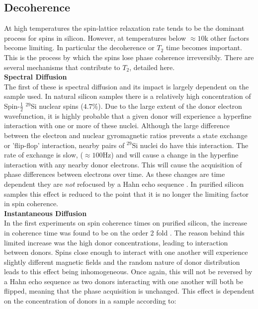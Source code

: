 \subsection{Decoherence}
\label{sec:litdecoherence}

At high temperatures the spin-lattice relaxation rate tends to be the dominant process for spins in silicon.
However, at temperatures below $\approx 10$k other factors become limiting. 
In particular the decoherence or $T_2$ time becomes important. 
This is the process by which the spins lose phase coherence irreversibly. 
There are several mechanisms that contribute to $T_2$, detailed here.
\\
\textbf{Spectral Diffusion}
\\
The first of these is spectral diffusion and its impact is largely dependent on the sample used.
In natural silicon samples there is a relatively high concentration of Spin-$\frac{1}{2}$ $^{29}$Si nuclear spins ($4.7\%$). 
Due to the large extent of the donor electron wavefunction, it is highly probable that a given donor will experience a hyperfine interaction with one or more of these nuclei.
Although the large difference between the electron and nuclear gyromagnetic ratios prevents a state exchange or 'flip-flop' interaction, nearby pairs of $^{29}$Si nuclei do have this interaction.
The rate of exchange is slow, ($\approx 100$Hz) and will cause a change in the hyperfine interaction with any nearby donor electrons.
This will cause the acquisition of phase differences between electrons over time.
As these changes are time dependent they are \textit{not} refocused by a Hahn echo sequence \cite{Wolfowicz2015a}. 
In purified silicon samples this effect is reduced to the point that it is no longer the limiting factor in spin coherence.
\\
\textbf{Instantaneous Diffusion}
\\
In the first experiments on spin coherence times on purified silicon, the increase in coherence time was found to be on the order 2 fold \cite{Gordon1958}.
The reason behind this limited increase was the high donor concentrations, leading to interaction between donors.
Spins close enough to interact with one another will experience slightly different magnetic fields and the random nature of donor distribution leads to this effect being inhomogeneous.
Once again, this will not be reversed by a Hahn echo sequence as two donors interacting with one another will both be flipped, meaning that the phase acquisition is unchanged.
This effect is dependent on the concentration of donors in a sample according to:

